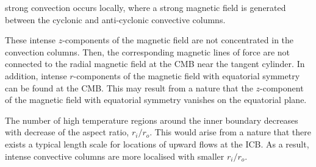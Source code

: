 strong convection occurs locally, where a strong magnetic field is generated between the cyclonic and anti-cyclonic convective columns.
%
{\color{green} %
These intense $z$-components of the magnetic field are not concentrated in the convection columns. 
Then, the corresponding magnetic lines of force are not connected to the radial magnetic field at the CMB near the tangent cylinder. 
In addition, intense $r$-components of the magnetic field with equatorial symmetry can be found at the CMB.
This may result from a nature that the $z$-component of the magnetic field with equatorial symmetry vanishes on the equatorial plane.

}
%
{\color{blue}
}
%
{\color{red}
The number of high temperature regions around the inner boundary decreases with decrease of the aspect ratio, $r_i / r_o$.
This would arise from a nature that there exists a typical length scale for locations of upward flows at the ICB.
As a result, intense convective columns are more localised with smaller $r_i / r_o$.
}
%
%
%
